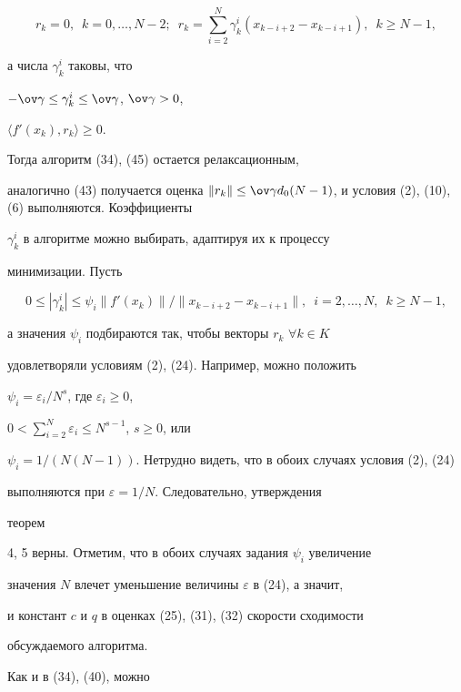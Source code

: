 \begin{equation}


r_k=0,\ \; k=0,\dotsc,N-2;\ \; r_k=\sum_{i=2}^{N}\gamma^i_k


(x_{k-i+2}-x_{k-i+1}),\ \; k\geq N-1,


\end{equation}


а числа $\gamma^i_k$ таковы, что 


$-\ov \gamma \leq \gamma^i_k\leq \ov \gamma$, $\ov\gamma >0$,


$\langle f'(x_k),r_k\rangle \geq 0$.


Тогда алгоритм (34), (45) остается релаксационным, 


аналогично (43) получается оценка $\|r_k\| \leq \ov \gamma 


d_0(N-1)$, и условия (2), (10), (6) выполняются. Коэффициенты


$\gamma_k^i$ в алгоритме можно выбирать, адаптируя их к процессу


минимизации. Пусть


$$


0\leq | {\gamma_k^i} | \leq \psi_i\| {{f}'(x_k) } \| /


\| {x_{k-i+2}-x_{k-i+1}} \|,\ \; i=2,\dotsc,N,\ \; k\geq N-1,


$$


а значения $\psi_i$ подбираются так, чтобы векторы $r_k$ $\forall k \in K$


удовлетворяли условиям (2), (24). Например, можно положить


$\psi_i=\varepsilon_i/N^s$, где $\varepsilon_i\geq 0$,


$0<\sum\limits_{i=2}^N\varepsilon_i\leq N^{s-1}$, $s\geq 0$, или


$\psi_i=1/(N(N-1))$. Нетрудно видеть, что в обоих случаях условия (2), (24)


выполняются при $\varepsilon =1/N$. Следовательно, утверждения 


теорем 


4, 5 верны. Отметим, что в обоих случаях задания $\psi_i$ увеличение 


значения $N$ влечет уменьшение величины $\varepsilon $ в (24), а значит,


и констант $c$ и $q$ в оценках (25), (31), (32) скорости сходимости 


обсуждаемого алгоритма.





Как и в (34), (40), можно 


